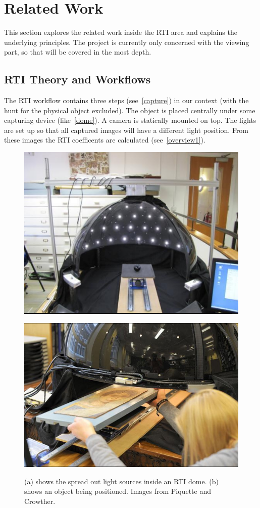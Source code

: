 \section{Related Work}
This section explores the related work inside the RTI area and explains the
underlying principles. The project is currently only concerned with the viewing
part, so that will be covered in the most depth.

\subsection{RTI Theory and Workflows}

The RTI workflow contains three steps (see~\autoref{capture}) in our context
(with the hunt for the physical object excluded). The object is placed centrally under
some capturing device (like~\autoref{dome}). A camera is
statically mounted on top. The lights are set up so that all captured images will have a different light position. From these
images the RTI coefficents are calculated (see~\autoref{overview1}).


\begin{figure}
\begin{subfloat}[]{\includegraphics[max width=0.5\linewidth]{images/rtiaction1}}\end{subfloat}
\begin{subfloat}[]{\includegraphics[max width=0.5\linewidth]{images/rtiaction2}}\end{subfloat}
\caption[RTI in Action]{(a) shows the spread out light sources inside an RTI
  dome. (b) shows an object being positioned. Images from Piquette and Crowther.\cite*{piquette_developing_2011}}
\label{dome}
\end{figure}



